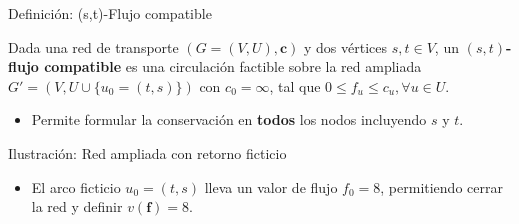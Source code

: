 \documentclass[
  ignorenonframetext,
]{beamer}
\providecommand{\tightlist}{%
  \setlength{\itemsep}{0pt}\setlength{\parskip}{0pt}}
\begin{document}
\begin{frame}{Definición: (s,t)-Flujo compatible}
\label{definiciuxf3n-st-flujo-compatible}
\begin{tcolorbox}[enhanced jigsaw, opacityback=0, breakable, title=\textcolor{quarto-callout-note-color}{\faInfo}\hspace{0.5em}{(s, t)-Flujo compatible}, colback=white, colbacktitle=quarto-callout-note-color!10!white, bottomrule=.15mm, opacitybacktitle=0.6, coltitle=black, bottomtitle=1mm, leftrule=.75mm, colframe=quarto-callout-note-color-frame, toptitle=1mm, titlerule=0mm, rightrule=.15mm, left=2mm, arc=.35mm, toprule=.15mm]

Dada una red de transporte \((G = (V, U), \mathbf{c})\) y dos vértices
\(s, t \in V\), un \textbf{\((s, t)\)-flujo compatible} es una
circulación factible sobre la red ampliada
\(G' = (V, U \cup \{u_0=(t,s)\})\) con \(c_0 = \infty\), tal que
\(0 \le f_u \le c_u, \forall u \in U\).

\end{tcolorbox}

\begin{itemize}
\tightlist
\item
  Permite formular la conservación en \textbf{todos} los nodos
  incluyendo \(s\) y \(t\).
\end{itemize}
\end{frame}

\begin{frame}{Ilustración: Red ampliada con retorno ficticio}
\label{ilustraciuxf3n-red-ampliada-con-retorno-ficticio}
\begin{itemize}
\tightlist
\item
  El arco ficticio \(u_0 = (t, s)\) lleva un valor de flujo \(f_0 = 8\),
  permitiendo cerrar la red y definir \(v(\mathbf{f}) = 8\).
\end{itemize}
\end{frame}
\end{document}

